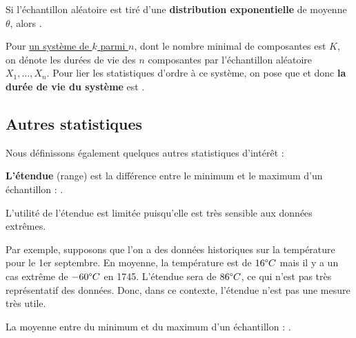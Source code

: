 \documentclass[french]{article}
\begin{document}
\begin{multicols*}{2}
\bigskip

Si l'échantillon aléatoire est tiré d'une \textbf{distribution exponentielle} de moyenne $\theta$, alors .

\bigskip

Pour \hyperlink{fiabilitykParmin}{\textcolor{bleudefrance}{un système de $k$ parmi $n$}}, dont le nombre minimal de composantes est $K$, on dénote les durées de vie des $n$ composantes par l'échantillon aléatoire $X_{1}, \dots, X_{n}$. Pour lier les statistiques d'ordre à ce système, on pose que  et donc \textbf{la durée de vie du système} est .



\columnbreak
\subsection{Autres statistiques}
Nous définissons également quelques autres statistiques d'intérêt :
\begin{definitionNOHFILLsub}
\textbf{L'étendue} (range) est la différence entre le minimum et le maximum d'un échantillon : .

\bigskip

\begin{rappel_enhanced}[Contexte]
L'utilité de l'étendue est limitée puisqu'elle est très sensible aux données extrêmes.

\bigskip

Par exemple, supposons que l’on a des données historiques sur la température pour le 1er septembre. En moyenne, la température est de $16\degree C$ mais il y a un cas extrême de $-60\degree C$ en 1745. L'étendue sera de $86\degree C$, ce qui n'est pas très représentatif des données. Donc, dans ce contexte, l'étendue n'est pas une mesure très utile.
\end{rappel_enhanced}
\end{definitionNOHFILLsub}


\begin{definitionNOHFILLsub}
La moyenne entre du minimum et du maximum d'un échantillon : .

\bigskip


\end{definitionNOHFILLsub}
\end{multicols*}
\end{document}
